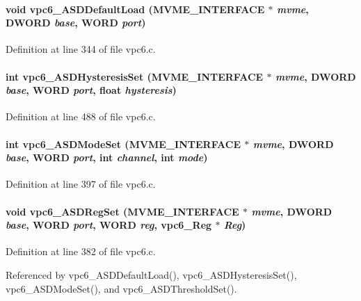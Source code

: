 \paragraph[{vpc6\_\-ASDDefaultLoad}]{\setlength{\rightskip}{0pt plus 5cm}void vpc6\_\-ASDDefaultLoad ({\bf MVME\_\-INTERFACE} $\ast$ {\em mvme}, \/  {\bf DWORD} {\em base}, \/  {\bf WORD} {\em port})}\hfill\label{vpc6_8h_a94c50f949c0ea364b353ec0500168839}


Definition at line 344 of file vpc6.c.
\paragraph[{vpc6\_\-ASDHysteresisSet}]{\setlength{\rightskip}{0pt plus 5cm}int vpc6\_\-ASDHysteresisSet ({\bf MVME\_\-INTERFACE} $\ast$ {\em mvme}, \/  {\bf DWORD} {\em base}, \/  {\bf WORD} {\em port}, \/  float {\em hysteresis})}\hfill\label{vpc6_8h_ab51848844d60ee696faced1132892995}


Definition at line 488 of file vpc6.c.
\paragraph[{vpc6\_\-ASDModeSet}]{\setlength{\rightskip}{0pt plus 5cm}int vpc6\_\-ASDModeSet ({\bf MVME\_\-INTERFACE} $\ast$ {\em mvme}, \/  {\bf DWORD} {\em base}, \/  {\bf WORD} {\em port}, \/  int {\em channel}, \/  int {\em mode})}\hfill\label{vpc6_8h_a4d16aafec8a77a2b1e6427a4fa1b7290}


Definition at line 397 of file vpc6.c.
\paragraph[{vpc6\_\-ASDRegSet}]{\setlength{\rightskip}{0pt plus 5cm}void vpc6\_\-ASDRegSet ({\bf MVME\_\-INTERFACE} $\ast$ {\em mvme}, \/  {\bf DWORD} {\em base}, \/  {\bf WORD} {\em port}, \/  {\bf WORD} {\em reg}, \/  {\bf vpc6\_\-Reg} $\ast$ {\em Reg})}\hfill\label{vpc6_8h_a3288a666b9c619cbb58157a5d9e070d1}


Definition at line 382 of file vpc6.c.

Referenced by vpc6\_\-ASDDefaultLoad(), vpc6\_\-ASDHysteresisSet(), vpc6\_\-ASDModeSet(), and vpc6\_\-ASDThresholdSet().
